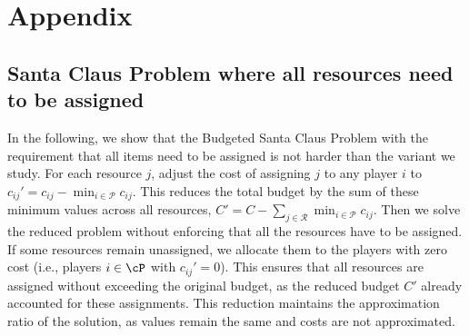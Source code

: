 \appendix
\section{Appendix}

\subsection{Santa Claus Problem where all resources need to be assigned}
\label{subsec:appendix-santa-claus-with-all-resources-assigned}
In the following, we show that the Budgeted Santa Claus Problem with the requirement that all items need to be assigned is not harder than the variant we study. 
For each resource $j$, adjust the cost of assigning $j$ to any player $i$ to $c_{ij}' = c_{ij} - \min_{i \in \mathcal{P}} c_{ij}$. This reduces the total budget by the sum of these minimum values across all resources, $C' = C - \sum_{j \in \mathcal{R}} \min_{i \in \mathcal{P}} c_{ij}$. Then we solve the reduced problem without enforcing that all the resources have to be assigned. If some resources remain unassigned, we allocate them to the players with zero cost (i.e., players $i \in \cP$ with $c_{ij}'  = 0$). This ensures that all resources are assigned without exceeding the original budget, as the reduced budget $C'$ already accounted for these assignments. This reduction maintains the approximation ratio of the solution, as values remain the same and costs are not approximated.